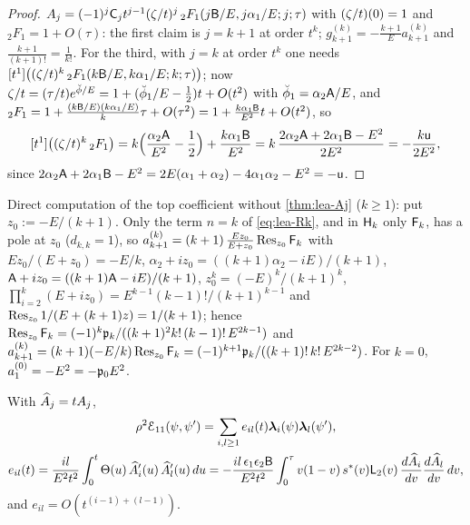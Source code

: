\begin{proof}
$A_j = (-1)^j\mathsf{C}_jt^{j-1}(\zeta/t)^j\,{}_2F_1(j\mathsf{B}/E,j\alpha_1/E;j;\tau)$ with $(\zeta/t)(0) = 1$ and ${}_2F_1 = 1 + O(\tau)$: the first claim is $j = k+1$ at order $t^k$; $g_{k+1}^{(k)} = -\frac{k+1}{E}a_{k+1}^{(k)}$ and $\frac{k+1}{(k+1)!} = \frac{1}{k!}$. For the third, with $j = k$ at order $t^k$ one needs $[t^1]\bigl((\zeta/t)^k\,{}_2F_1(k\mathsf{B}/E,k\alpha_1/E;k;\tau)\bigr)$; now $\zeta/t = (\tau/t)e^{\breve{\phi}/E} = 1 + (\breve{\phi}_1/E - \tfrac12)t + O(t^2)$ with $\breve{\phi}_1 = \alpha_2\mathsf{A}/E$, and ${}_2F_1 = 1 + \frac{(k\mathsf{B}/E)(k\alpha_1/E)}{k}\tau + O(\tau^2) = 1 + \frac{k\alpha_1\mathsf{B}}{E^2}t + O(t^2)$, so
\[
[t^1]\bigl((\zeta/t)^k\,{}_2F_1\bigr) = k\Bigl(\frac{\alpha_2\mathsf{A}}{E^2} - \frac12\Bigr) + \frac{k\alpha_1\mathsf{B}}{E^2} = k\,\frac{2\alpha_2\mathsf{A} + 2\alpha_1\mathsf{B} - E^2}{2E^2} = -\frac{k\mathsf{u}}{2E^2},
\]
since $2\alpha_2\mathsf{A} + 2\alpha_1\mathsf{B} - E^2 = 2E(\alpha_1+\alpha_2) - 4\alpha_1\alpha_2 - E^2 = -\mathsf{u}$.
\end{proof}

Direct computation of the top coefficient without \cref{thm:lea-Aj} ($k\geq 1$): put $z_0 := -E/(k+1)$. Only the term $n = k$ of \eqref{eq:lea-Rk}, and in $\mathsf{H}_k$ only $\mathsf{F}_k$, has a pole at $z_0$ ($d_{k,k} = 1$), so $a_{k+1}^{(k)} = (k+1)\,\frac{Ez_0}{E+z_0}\operatorname*{Res}_{z_0}\mathsf{F}_k$ with $Ez_0/(E+z_0) = -E/k$, $\alpha_2+iz_0 = ((k+1)\alpha_2-iE)/(k+1)$, $\mathsf{A}+iz_0 = ((k+1)\mathsf{A}-iE)/(k+1)$, $z_0^k = (-E)^k/(k+1)^k$, $\prod_{i=2}^{k}(E+iz_0) = E^{k-1}(k-1)!/(k+1)^{k-1}$ and $\operatorname*{Res}_{z_0}1/(E+(k+1)z) = 1/(k+1)$; hence $\operatorname*{Res}_{z_0}\mathsf{F}_k = (-1)^k\mathfrak{p}_k/((k+1)^2k!\,(k-1)!\,E^{2k-1})$ and $a_{k+1}^{(k)} = (k+1)(-E/k)\operatorname*{Res}_{z_0}\mathsf{F}_k = (-1)^{k+1}\mathfrak{p}_k/((k+1)!\,k!\,E^{2k-2})$. For $k = 0$, $a_1^{(0)} = -E^2 = -\mathfrak{p}_0E^2$.

\begin{thm}
\label{thm:lea-loops}
With $\widehat{A}_j = tA_j$,
\begin{equation}
\label{eq:lea-loops}
\begin{gathered}
\rho^2\mathcal{E}_{11}(\psi,\psi') = \sum_{i,l\geq 1}e_{il}(t)\boldsymbol{\lambda}_i(\psi)\boldsymbol{\lambda}_l(\psi'),\\
e_{il}(t) = \frac{il}{E^2t^2}\int_0^t\Theta(u)\,\widehat{A}_i'(u)\,\widehat{A}_l'(u)\,du
= -\frac{il\,\epsilon_1\epsilon_2\mathsf{B}}{E^2t^2}\int_0^{\tau}v(1-v)\,s^{\ast}(v)\mathsf{L}_2(v)\,\frac{d\widehat{A}_i}{dv}\frac{d\widehat{A}_l}{dv}\,dv,
\end{gathered}
\end{equation}
and $e_{il} = O(t^{(i-1)+(l-1)})$.
\end{thm}

